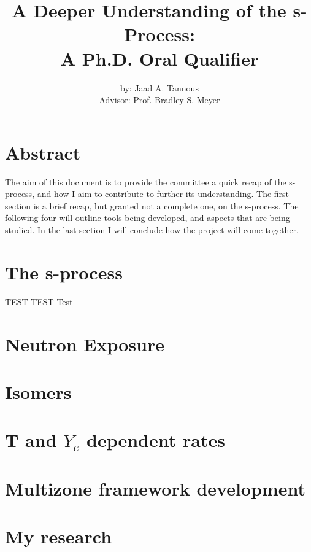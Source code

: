 \documentclass{article}
\title{A Deeper Understanding of the s-Process:\\
A Ph.D. Oral Qualifier}
\author{by: Jaad A. Tannous\\
Advisor: Prof. Bradley S. Meyer}
\date{}
\begin{document}
\maketitle

\section*{Abstract}
The aim of this document is to provide the committee a quick recap of the s-process, and how I aim to 
contribute to further its understanding. The first section is a brief recap, but granted not a complete 
one, on the s-process. The following four will outline tools being developed, and aspects that are being 
studied. In the last section I will conclude how the project will come together.
\section*{The s-process}
TEST TEST Test
\section*{Neutron Exposure}
\section*{Isomers}
\section*{T and $Y_{e}$ dependent rates}
\section*{Multizone framework development}
\section*{My research}
\end{document}
